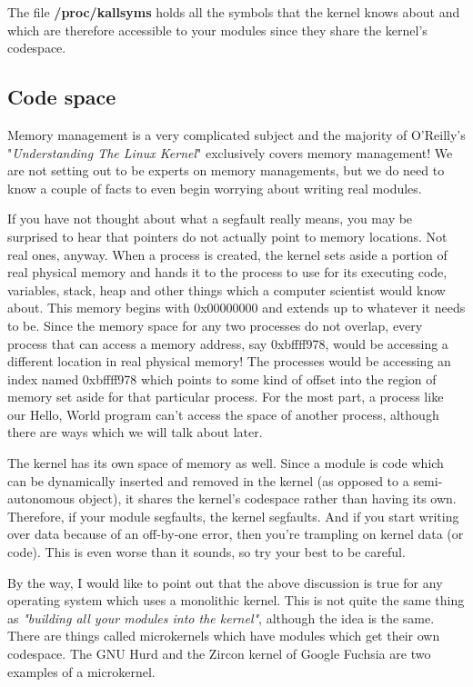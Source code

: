 \documentclass[10pt, oneside]{book}
\begin{document}
The file \textbf{/proc/kallsyms} holds all the symbols that the kernel knows about and which are therefore accessible to your modules since they share the kernel's codespace.

\subsection{Code space}
\label{sec:codespace}
Memory management is a very complicated subject and the majority of O'Reilly's "\emph{Understanding The Linux Kernel}" exclusively covers memory management!
We are not setting out to be experts on memory managements, but we do need to know a couple of facts to even begin worrying about writing real modules.

If you have not thought about what a segfault really means, you may be surprised to hear that pointers do not actually point to memory locations.
Not real ones, anyway.
When a process is created, the kernel sets aside a portion of real physical memory and hands it to the process to use for its executing code, variables, stack, heap and other things which a computer scientist would know about.
This memory begins with 0x00000000 and extends up to whatever it needs to be.
Since the memory space for any two processes do not overlap, every process that can access a memory address, say 0xbffff978, would be accessing a different location in real physical memory! The processes would be accessing an index named 0xbffff978 which points to some kind of offset into the region of memory set aside for that particular process.
For the most part, a process like our Hello, World program can't access the space of another process, although there are ways which we will talk about later.

The kernel has its own space of memory as well. Since a module is code which can be dynamically inserted and removed in the kernel (as opposed to a semi-autonomous object), it shares the kernel's codespace rather than having its own.
Therefore, if your module segfaults, the kernel segfaults.
And if you start writing over data because of an off-by-one error, then you're trampling on kernel data (or code).
This is even worse than it sounds, so try your best to be careful.

By the way, I would like to point out that the above discussion is true for any operating system which uses a monolithic kernel.
This is not quite the same thing as \emph{"building all your modules into the kernel"}, although the idea is the same.
There are things called microkernels which have modules which get their own codespace.
The GNU Hurd and the Zircon kernel of Google Fuchsia are two examples of a microkernel.
\end{document}
